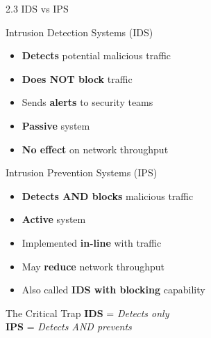 \documentclass{beamer}
\begin{document}
	\begin{frame}{2.3 IDS vs IPS}
		\begin{block}{Intrusion Detection Systems (IDS)}
			\begin{itemize}
				\item \textbf{Detects} potential malicious traffic
				\item \textbf{Does NOT block} traffic
				\item Sends \textbf{alerts} to security teams
				\item \textbf{Passive} system
				\item \textbf{No effect} on network throughput
			\end{itemize}
		\end{block}
		
		\begin{block}{Intrusion Prevention Systems (IPS)}
			\begin{itemize}
				\item \textbf{Detects AND blocks} malicious traffic
				\item \textbf{Active} system
				\item Implemented \textbf{in-line} with traffic
				\item May \textbf{reduce} network throughput
				\item Also called \textbf{IDS with blocking} capability
			\end{itemize}
		\end{block}
		
		\begin{alertblock}{The Critical Trap}
			\textbf{IDS} = \textit{Detects only} \\
			\textbf{IPS} = \textit{Detects AND prevents}
		\end{alertblock}
	\end{frame}
	
\end{document}
